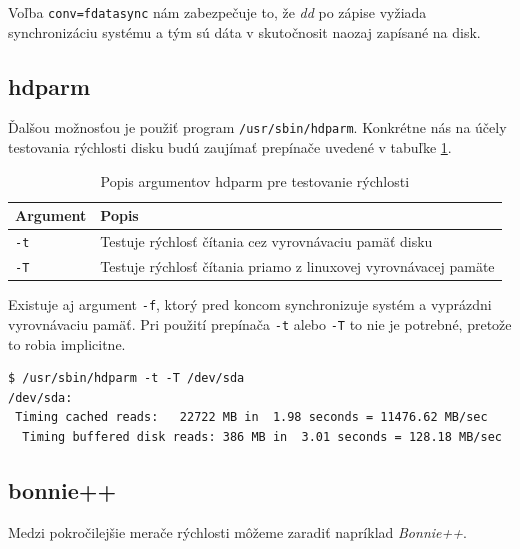Voľba \texttt{conv=fdatasync} nám zabezpečuje to, že \emph{dd} po zápise
vyžiada synchronizáciu systému a tým sú dáta v skutočnosit naozaj zapísané na
disk.

%
%

\subsection{hdparm}

Ďalšou možnosťou je použiť program \texttt{/usr/sbin/hdparm}. Konkrétne nás na účely testovania rýchlosti disku budú zaujímať prepínače uvedené v tabuľke \ref{tab:hdparm-args}.

\begin{table}[H]
\begin{center}
\begin{tabular}{|l|l|}
    \hline
    \textbf{Argument} & \textbf{Popis} \\
    \hline
    \texttt{-t}  & Testuje rýchlosť čítania cez vyrovnávaciu pamäť disku \\
    \texttt{-T}  & Testuje rýchlosť čítania priamo z linuxovej vyrovnávacej pamäte \\
    \hline
\end{tabular}
\caption{Popis argumentov hdparm pre testovanie rýchlosti}
\label{tab:hdparm-args}
\end{center}
\end{table}

Existuje aj argument \texttt{-f}, ktorý pred koncom synchronizuje systém a
vyprázdni vyrovnávaciu pamäť. Pri použití prepínača \texttt{-t} alebo
\texttt{-T} to nie je potrebné, pretože to robia implicitne.

\renewcommand{\lstlistingname}{Ukážka}
\begin{lstlisting}[label=alg:hdparm-usage,caption=Príklad použitia nástroja hdparm]
$ /usr/sbin/hdparm -t -T /dev/sda
/dev/sda:
 Timing cached reads:   22722 MB in  1.98 seconds = 11476.62 MB/sec
  Timing buffered disk reads: 386 MB in  3.01 seconds = 128.18 MB/sec

\end{lstlisting}
\renewcommand{\lstlistingname}{\listingAlgoritmus}

%
%

\subsection{bonnie++}

Medzi pokročilejšie merače rýchlosti môžeme zaradiť napríklad \emph{Bonnie++}.

